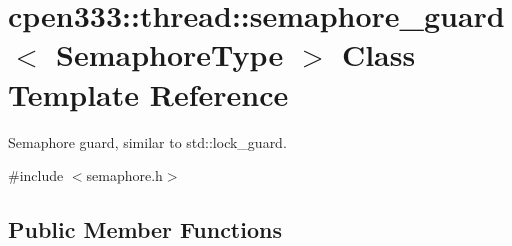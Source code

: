 \hypertarget{classcpen333_1_1thread_1_1semaphore__guard}{}\section{cpen333\+:\+:thread\+:\+:semaphore\+\_\+guard$<$ Semaphore\+Type $>$ Class Template Reference}
\label{classcpen333_1_1thread_1_1semaphore__guard}


Semaphore guard, similar to std\+::lock\+\_\+guard.  




{\ttfamily \#include $<$semaphore.\+h$>$}

\subsection*{Public Member Functions}
